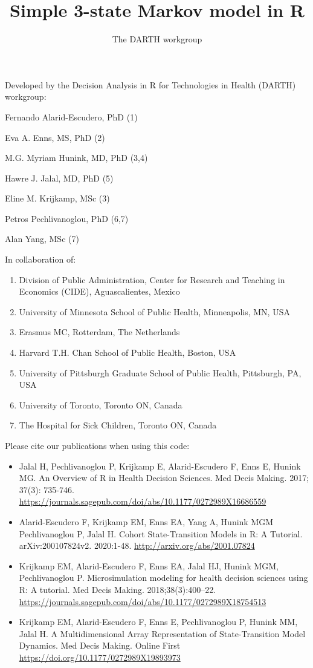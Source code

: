 \documentclass[
]{article}
\title{Simple 3-state Markov model in R}
\author{The DARTH workgroup}
\date{}
\providecommand{\tightlist}{%
  \setlength{\itemsep}{0pt}\setlength{\parskip}{0pt}}
\begin{document}
\maketitle

Developed by the Decision Analysis in R for Technologies in Health
(DARTH) workgroup:

Fernando Alarid-Escudero, PhD (1)

Eva A. Enns, MS, PhD (2)

M.G. Myriam Hunink, MD, PhD (3,4)

Hawre J. Jalal, MD, PhD (5)

Eline M. Krijkamp, MSc (3)

Petros Pechlivanoglou, PhD (6,7)

Alan Yang, MSc (7)

In collaboration of:

\begin{enumerate}
\def\labelenumi{\arabic{enumi}.}
\tightlist
\item
  Division of Public Administration, Center for Research and Teaching in
  Economics (CIDE), Aguascalientes, Mexico
\item
  University of Minnesota School of Public Health, Minneapolis, MN, USA
\item
  Erasmus MC, Rotterdam, The Netherlands
\item
  Harvard T.H. Chan School of Public Health, Boston, USA
\item
  University of Pittsburgh Graduate School of Public Health, Pittsburgh,
  PA, USA
\item
  University of Toronto, Toronto ON, Canada
\item
  The Hospital for Sick Children, Toronto ON, Canada
\end{enumerate}

Please cite our publications when using this code:

\begin{itemize}
\item
  Jalal H, Pechlivanoglou P, Krijkamp E, Alarid-Escudero F, Enns E,
  Hunink MG. An Overview of R in Health Decision Sciences. Med Decis
  Making. 2017; 37(3): 735-746.
  \url{https://journals.sagepub.com/doi/abs/10.1177/0272989X16686559}
\item
  Alarid-Escudero F, Krijkamp EM, Enns EA, Yang A, Hunink MGM
  Pechlivanoglou P, Jalal H. Cohort State-Transition Models in R: A
  Tutorial. arXiv:200107824v2. 2020:1-48.
  \url{http://arxiv.org/abs/2001.07824}
\item
  Krijkamp EM, Alarid-Escudero F, Enns EA, Jalal HJ, Hunink MGM,
  Pechlivanoglou P. Microsimulation modeling for health decision
  sciences using R: A tutorial. Med Decis Making. 2018;38(3):400--22.
  \url{https://journals.sagepub.com/doi/abs/10.1177/0272989X18754513}
\item
  Krijkamp EM, Alarid-Escudero F, Enns E, Pechlivanoglou P, Hunink MM,
  Jalal H. A Multidimensional Array Representation of State-Transition
  Model Dynamics. Med Decis Making. Online First
  \url{https://doi.org/10.1177/0272989X19893973}
\end{itemize}
\end{document}
